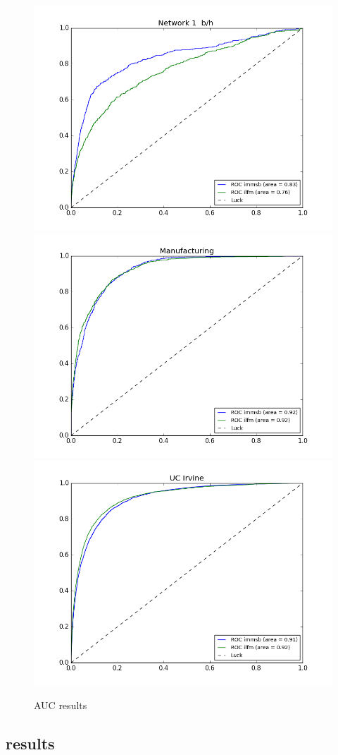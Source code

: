 \begin{figure}[h]
	\endminipage
	\includegraphics[scale=0.22]{img/M_e/AUC-ROC/figure_4}
	\endminipage
		\vspace{-0.4cm}
	\includegraphics[scale=0.22]{img/M_e/AUC-ROC/figure_5}
	\endminipage
	\includegraphics[scale=0.22]{img/M_e/AUC-ROC/figure_6}
	\endminipage
	
	\caption{AUC results}
	\label{fig:auc}
\end{figure}



\subsection{results}

